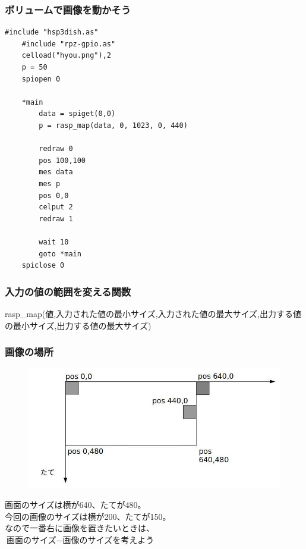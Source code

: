 \begin{frame}[fragile]
    \frametitle{ボリュームで画像を動かそう}
    \begin{lstlisting}[title=\textasciitilde/05/angle.hsp]
    #include "hsp3dish.as"
    #include "rpz-gpio.as"
    celload("hyou.png"),2
    p = 50
    spiopen 0

    *main
	    data = spiget(0,0)
	    p = rasp_map(data, 0, 1023, 0, 440)

	    redraw 0
	    pos 100,100
	    mes data
	    mes p
	    pos 0,0
	    celput 2
	    redraw 1

    	wait 10	
	    goto *main
    spiclose 0
    \end{lstlisting}
\end{frame}

\begin{frame}[fragile]
    \frametitle{入力の値の範囲を変える関数}
    \begin{center}
        \begin{figure}
            
        \end{figure}
        {rasp\_map(値,入力された値の最小サイズ,入力された値の最大サイズ,出力する値の最小サイズ,出力する値の最大サイズ)}
    \end{center}
\end{frame}

\begin{frame}[fragile]
    \frametitle{画像の場所}
    \begin{center}
        \begin{figure}
            \includegraphics[width=\textwidth]{images/slide/volume_position.jpg}
        \end{figure}
        {画面のサイズは横が640、たてが480。\\
        今回の画像のサイズは横が200、たてが150。\\
        なので一番右に画像を置きたいときは、\\
        $\mbox{画面のサイズ}-\mbox{画像のサイズを考えよう}$}
    \end{center}
\end{frame}

